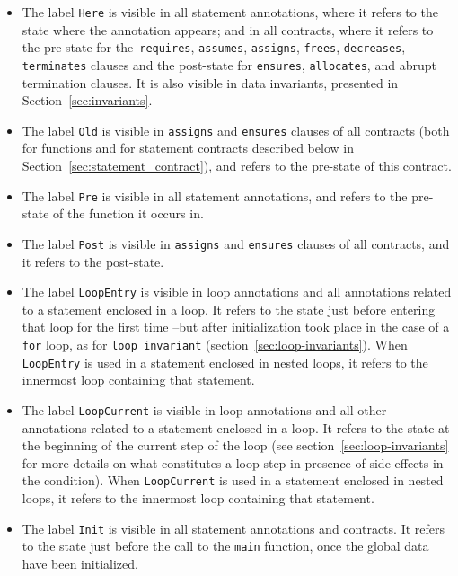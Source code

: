 \begin{itemize}

\item The label \lstinline|Here| is visible in all statement annotations,
  where it refers to the state where the annotation appears; and in
  all contracts, where it refers to the pre-state for
  the~\lstinline|requires|, \lstinline|assumes|, \lstinline|assigns|,
  \lstinline|frees|,
  \lstinline|decreases|,
  \lstinline|terminates|
  clauses and the post-state for 
  \lstinline|ensures|, \lstinline|allocates|, and abrupt termination
  clauses.
It is also visible in data invariants, presented in Section~\ref{sec:invariants}.
\item The label \lstinline|Old| is visible in \lstinline|assigns| and
  \lstinline|ensures| clauses of all contracts (both for functions and for
  statement contracts described below in
  Section~\ref{sec:statement_contract}), and refers to the pre-state
  of this contract.
\item The label \lstinline|Pre| is visible in all statement annotations,
  and refers to the pre-state of the function it occurs in.
\item The label \lstinline|Post| is visible in
\lstinline|assigns| and \lstinline|ensures| clauses of all contracts,
and it refers to the post-state.

\item The label \lstinline|LoopEntry|
is visible in loop annotations and
all annotations related to a statement enclosed in a loop.
It refers to the state just before entering that loop
for the first time --but after initialization took place in the case of a 
\lstinline|for| loop, as for \lstinline|loop invariant| 
(section~\ref{sec:loop-invariants}). When \lstinline|LoopEntry| is used in a 
statement enclosed in nested loops, it
refers to the innermost loop containing that statement.

\item The label \lstinline|LoopCurrent|
is visible in loop annotations and
all other annotations related to a statement enclosed in a loop.
It refers to the state at the beginning of the current step of the loop (see
section~\ref{sec:loop-invariants} for more details on what constitutes a loop
step in presence of side-effects in the condition). When
\lstinline|LoopCurrent| is used in a statement enclosed in nested loops, it
refers to the innermost loop containing that statement.

\item The label \lstinline|Init| is visible in all statement annotations and 
contracts. It refers to the state just before the call to the \lstinline|main| 
function, once the global data have been initialized.
\end{itemize}

